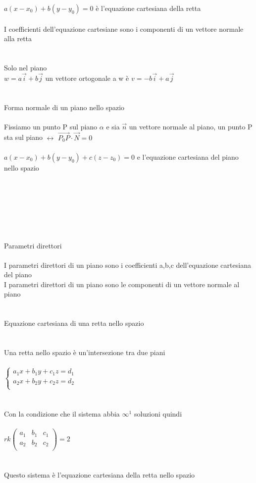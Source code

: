 \documentclass{article}
\begin{document}
\(a(x-x_0)+b(y-y_0)=0\) è l'equazione cartesiana della retta\\\\
I coefficienti dell'equazione cartesiane sono i componenti di un vettore normale alla retta\\\\\\
Solo nel piano\\
\(w=a\vec{i}+b\vec{j}\) un vettore ortogonale a w è \(v=-b\vec{i}+a\vec{j}\)\\\\\\
{\large Forma normale di un piano nello spazio}\\\\
Fissiamo un punto P sul piano \(\alpha\) e sia \(\vec{n}\) un vettore normale al piano, un punto P sta sul piano \(\leftrightarrow\) \(\vec{P_0P}\cdot\vec{N}=0\)\\\\
\(a(x-x_0)+b(y-y_0)+c(z-z_0)=0\) e l'equazione cartesiana del piano nello spazio\\\\\\\\\\\\\\\\
Parametri direttori\\\\
I parametri direttori di un piano sono i coefficienti a,b,c dell'equazione cartesiana del piano\\
I parametri direttori di un piano sono le componenti di un vettore normale al piano\\\\\\
Equazione cartesiana di una retta nello spazio\\\\\\
Una retta nello spazio è un'intersezione tra due piani\\\\
\(
\begin{cases}
    a_1x+b_1y+c_1z=d_1\\
    a_2x+b_2y+c_2z=d_2\\
\end{cases}
\)\\\\\\
Con la condizione che il sistema abbia \(\infty^1\) soluzioni quindi\\\\
\(rk\left(
\begin{array}{ccc}
    a_1 & b_1 & c_1\\
    a_2 & b_2 & c_2\\ 
\end{array}
\right)=2\)\\\\\\
Questo sistema è l'equazione cartesiana della retta nello spazio\\\\
\end{document}
